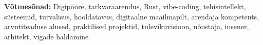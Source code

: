 \vspace{0.5cm}

\noindent\textbf{Võtmesõnad:} Digipööre, tarkvaraarendus, Rust, vibe-coding, tehisintellekt, süsteemid, turvalisus, hooldatavus, digitaalne maailmapilt, arendaja kompetents, arvutiteaduse alused, praktilised projektid, tulevikuvisioon, nõustaja, insener, arhitekt, vigade haldamine

\renewcommand{\contentsname}{Sisukord}
\tableofcontents
\clearpage


